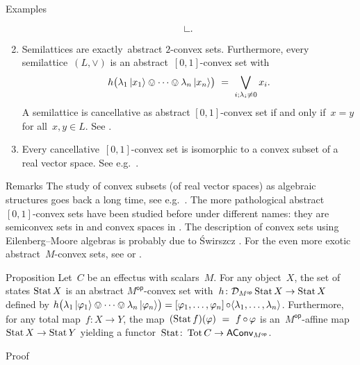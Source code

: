 \documentclass[b]{subfiles}
\begin{document}
\begin{parsec}
\begin{point}{Examples}
\begin{enumerate}
\begin{equation*}
\begin{tikzpicture}[scale=0.2]
    \draw (0,0) -- (0,1) ; 
    \draw (1,0) -- (0,0) ; 
\end{tikzpicture}.
\end{equation*}
\item
Semilattices are exactly~abstract $2$-convex sets.
Furthermore, every semilattice~$(L, \vee)$
    is an abstract~$[0,1]$-convex set
    with
    \begin{equation*}
    h\bigl(\lambda_1 \ket{x_1} \ovee \cdots \ovee \lambda_n \ket{x_n}\bigr)
        \ =\  \bigvee_{i; \lambda_i \neq 0} x_i.
    \end{equation*}
    A semilattice is cancellative as abstract $[0,1]$-convex set
    if and only if~$x=y$ for all~$x,y\in L$.
    See .
\item
Every cancellative~$[0,1]$-convex set
    is isomorphic to a convex subset of a real vector space.
    See e.g.~\cite[Thm.~8]{statesofconvexsets}.
\end{enumerate}
\begin{point}{Remarks}%
The study of
    convex subsets (of real vector spaces)
    as algebraic structures goes back a long time,
        see e.g.~\cite{stone1949postulates,neumann1970quasivariety,flood1981semiconvex,tz2009convex,gudder1979general}.
The more pathological abstract~$[0,1]$-convex sets have been studied before
    under different names:
    they are semiconvex sets in \cite{flood1981semiconvex,swirszcz1975monadic} and
    convex spaces in \cite{tz2009convex}.
The description of convex sets using Eilenberg--Moore algebras is probably
    due to \'Swirszcz \cite{swirszcz1975monadic}.
For the even more exotic abstract~$M$-convex
    sets, see \cite{effintro} or
        \cite{probdistrconv}.
\end{point}
\end{point}
\begin{point}{Proposition}%
Let~$C$ be an effectus with scalars~$M$.
For any object~$X$, the set of states
$\operatorname{Stat} X$ is an abstract $M^{\mathsf{op}}$-convex set
with~$h\colon \mathcal{D}_{M^{\mathsf{op}}} \operatorname{Stat} X \to \operatorname{Stat} X$
    defined by
    $h\bigl( \lambda_1 \ket{\varphi_1} \ovee \cdots \ovee \lambda_n \ket{\varphi_n} \bigr)
     =  [\varphi_1, \ldots, \varphi_n] \mathop{\circ} \langle
                    \lambda_1, \ldots, \lambda_n\rangle$.
Furthermore,
    for any total map~$f\colon X \to Y$,
    the map~$ (\operatorname{Stat} f)(\varphi) \ = \ f \mathop{\circ} \varphi$
    is an~$M^{\mathsf{op}}$-affine map~$\operatorname{Stat} X \to \operatorname{Stat} Y$ yielding a
    functor~$\operatorname{Stat} \colon \operatorname{Tot} C \to \mathsf{AConv}_{M^{\mathsf{op}}}$.
\begin{point}{Proof}%

\end{point}
\end{point}
\end{parsec}
\end{document}
